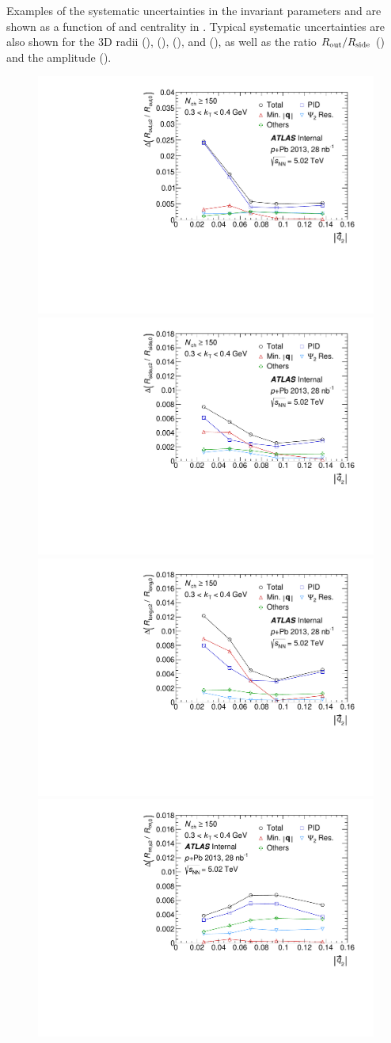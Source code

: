 Examples of the systematic uncertainties in the invariant parameters \Rinv and \linv are shown as a function of \kt and centrality in .
Typical systematic uncertainties are also shown for the 3D radii \Rout (), \Rside (), \Rlong (), and \Rol (), as well as the ratio $R_{\mathrm{out}} / R_{\mathrm{side}}$ () and the amplitude ().

\begin{figure}[t]
\centering
\includegraphics[width=.49\linewidth]{can_syst_breakdown_gr_u_Rout_vs_q2_kt2.pdf}
\includegraphics[width=.49\linewidth]{can_syst_breakdown_gr_u_Rside_vs_q2_kt2.pdf}\\
\includegraphics[width=.49\linewidth]{can_syst_breakdown_gr_u_Rlong_vs_q2_kt2.pdf}
\includegraphics[width=.49\linewidth]{can_syst_breakdown_gr_w_Ros_vs_q2_kt2.pdf}\\

\end{figure}
